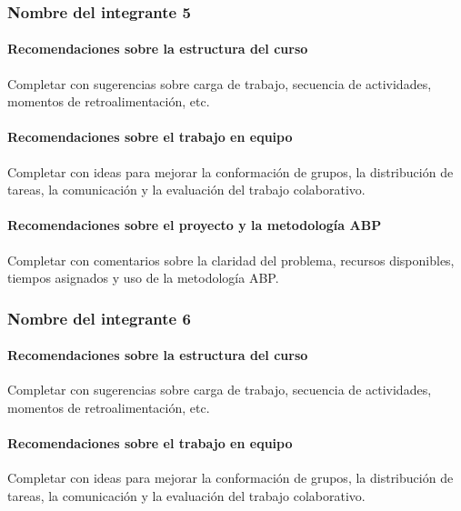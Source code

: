 \documentclass[11pt,a4paper]{article}
\begin{document}
\subsubsection*{Nombre del integrante 5}

\paragraph{Recomendaciones sobre la estructura del curso}
Completar con sugerencias sobre carga de trabajo, secuencia de actividades,
momentos de retroalimentación, etc.

\paragraph{Recomendaciones sobre el trabajo en equipo}
Completar con ideas para mejorar la conformación de grupos, la distribución
de tareas, la comunicación y la evaluación del trabajo colaborativo.

\paragraph{Recomendaciones sobre el proyecto y la metodología ABP}
Completar con comentarios sobre la claridad del problema, recursos
disponibles, tiempos asignados y uso de la metodología ABP.

\subsubsection*{Nombre del integrante 6}

\paragraph{Recomendaciones sobre la estructura del curso}
Completar con sugerencias sobre carga de trabajo, secuencia de actividades,
momentos de retroalimentación, etc.

\paragraph{Recomendaciones sobre el trabajo en equipo}
Completar con ideas para mejorar la conformación de grupos, la distribución
de tareas, la comunicación y la evaluación del trabajo colaborativo.
\end{document}
